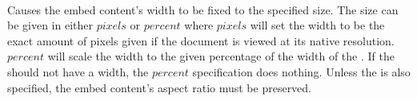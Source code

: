  \\

Causes the embed content's width to be fixed to the specified size. The size can be given in either \inline$pixels$ or \inline$percent$ where \inline$pixels$ will set the width to be the exact amount of pixels given if the document is viewed at its native resolution. \inline$percent$ will scale the width to the given percentage of the width of the . If the  should not have a width, the \inline$percent$ specification does nothing. Unless the  is also specified, the embed content's aspect ratio must be preserved. \\

\begin{examples}
\end{examples}

